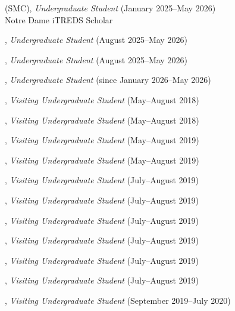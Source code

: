 \documentclass[10pt]{article}
\newenvironment{myindentpar}[1]%
{\begin{list}{}%
         {\setlength{\leftmargin}{#1}}%
         \item[]%
}
{\end{list}}
\newcounter{list}
\begin{document}
\begin{myindentpar}{0.75cm}
\hspace{-0.75cm}{\bf Katherine O'Roark} (SMC), \textit{Undergraduate Student} (January 2025--May 2026) \\
	{Notre Dame iTREDS Scholar}

\hspace{-0.75cm}{\bf Luke Cao}, \textit{Undergraduate Student} (August 2025--May 2026)

\hspace{-0.75cm}{\bf Max Johnson}, \textit{Undergraduate Student} (August 2025--May 2026)

\hspace{-0.75cm}{\bf Anna Arnett}, \textit{Undergraduate Student} (since January 2026--May 2026)

\hspace{-0.75cm}{\bf Wenhao Yu}, \textit{Visiting Undergraduate Student} (May--August 2018)

\hspace{-0.75cm}{\bf Yu Shu}, \textit{Visiting Undergraduate Student} (May--August 2018)

\hspace{-0.75cm}{\bf Chuchen Deng}, \textit{Visiting Undergraduate Student} (May--August 2019)

\hspace{-0.75cm}{\bf Yihong Ma}, \textit{Visiting Undergraduate Student} (May--August 2019)

\hspace{-0.75cm}{\bf Xin Liu}, \textit{Visiting Undergraduate Student} (July--August 2019)

\hspace{-0.75cm}{\bf Wei Peng}, \textit{Visiting Undergraduate Student} (July--August 2019)

\hspace{-0.75cm}{\bf Mengxia Yu}, \textit{Visiting Undergraduate Student} (July--August 2019)

\hspace{-0.75cm}{\bf Kaifeng Yu}, \textit{Visiting Undergraduate Student} (July--August 2019)

\hspace{-0.75cm}{\bf Zhihan Zhang}, \textit{Visiting Undergraduate Student} (July--August 2019)

\hspace{-0.75cm}{\bf Yang Zhou}, \textit{Visiting Undergraduate Student} (July--August 2019)

\hspace{-0.75cm}{\bf Zaitang Li}, \textit{Visiting Undergraduate Student} (September 2019--July 2020)


\end{myindentpar}
\end{document}
